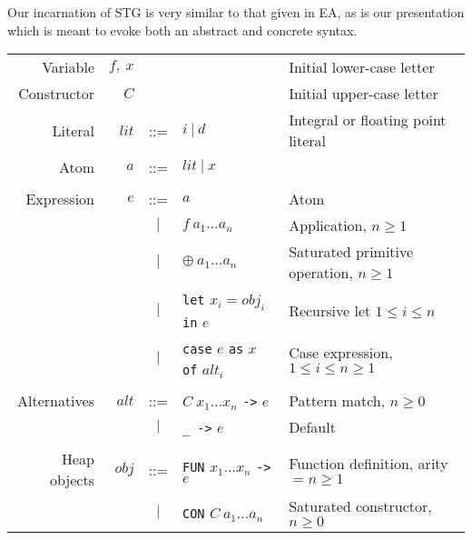 \documentclass{llncs}
\begin{document}
Our incarnation of STG is very similar to that given in EA, as is
our presentation which is meant to evoke both an abstract and concrete syntax.

\begin{table}
\footnotesize %
\centering
\begin{tabular}{r r c l l}

Variable     & $f,\ x$        &     &                                              & Initial lower-case letter \\
Constructor  & $C$            &     &                                              & Initial upper-case letter \\
Literal      & $\mathit{lit}$ & ::= & $i\ |\ d$                                    & Integral or floating point literal \\
Atom         & $a$            & ::= & $\mathit{lit}\ |\ x$                         & \\ %
\\
Expression   & $e$            & ::= & $a$                                          & Atom \\
             &                & $|$ & $f\ a_1\dots a_n$                            & Application, $n\ge 1$ \\
             &                & $|$ & $\oplus\ a_1\dots a_n$                       & Saturated primitive operation, $n\ge 1$ \\
             &                & $|$ & \texttt{let} $x_i = \mathit{obj}_i$
                                         \texttt{in} $e$                           & Recursive let $1\le i \le n$\\
             &                & $|$ & \texttt{case} $e$ \texttt{as}
                                        $x$ \texttt{of} $\mathit{alt}_i$           & Case expression, $1\le i \le n \ge 1$\\
\\
Alternatives & $\mathit{alt}$ & ::= & $C\ x_1\dots x_n$ \texttt{->} $e$            & Pattern match, $n \ge 0$ \\
             &                & $|$ & \texttt{\_ ->} $e$                           & Default \\
\\
Heap objects & $\mathit{obj}$ & ::= &\texttt{FUN} $x_1\dots x_n$ \texttt{->} $e$   & Function definition, arity $=n\ge 1$ \\
             &                & $|$ &\texttt{CON} $C\ a_1\dots a_n$                & Saturated constructor, $n \ge 0$ \\

\end{tabular}
\end{table}
\end{document}
